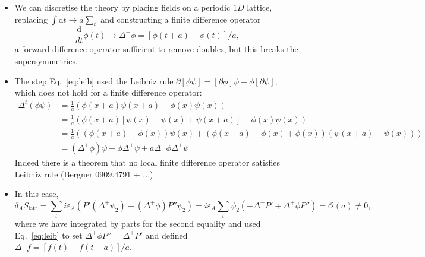 \begin{itemize}
    \item We can discretise the theory by placing fields on a periodic $1D$ lattice, replacing $\int \text{d}t \to a \sum_t$ and constructing a finite difference operator
\begin{equation}
    \frac{\text{d}}{dt}\phi(t) \to \Delta^+ \phi = [\phi(t+a) - \phi(t)]/a,
\end{equation}
a forward difference operator sufficient to remove doubles, but this breaks the supersymmetries.
    \item The step Eq.~\eqref{eq:leib} used the Leibniz rule $\partial[\phi \psi] = [\partial \phi] \psi + \phi [\partial \psi]$, which does not hold for a finite difference operator:
\begin{align}
    \Delta^t(\phi \psi) &= \frac{1}{a}(\phi(x+a) \psi(x+a) - \phi(x) \psi(x)) \nonumber \\
    &= \frac{1}{a}(\phi(x+a)[\psi(x) - \psi(x) + \psi(x+a)] - \phi(x) \psi(x)) \nonumber \\
    &= \frac{1}{a}((\phi(x+a) - \phi(x))\psi(x) + (\phi(x+a) - \phi(x) + \phi(x))(\psi(x+a) - \psi(x))) \nonumber \\
    &= (\Delta^+ \phi) \psi + \phi \Delta^+ \psi + a \Delta^+ \phi \Delta^+ \psi
\end{align}
Indeed there is a theorem that no local finite difference operator satisfies Leibniz rule (Bergner 0909.4791 + ...)

    \item In this case,
\begin{equation}
    \delta_A S_\text{latt} = \sum_t i \varepsilon_A(P'(\Delta^+ \psi_2) + (\Delta^+ \phi) P''\psi_2) = i \varepsilon_A \sum_t \psi_2(- \Delta^- P' + \Delta^+ \phi P'')= \mathcal{O}(a) \neq 0,
\end{equation}
where we have integrated by parts for the second equality and used Eq.~\eqref{eq:leib} to set $\Delta^+\phi P''=\Delta^+P'$ and defined $\Delta^-f=[f(t)-f(t-a)]/a$.


\end{itemize}
